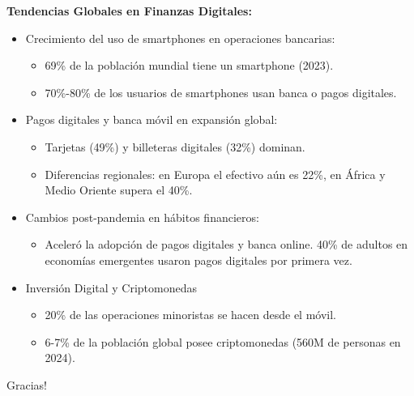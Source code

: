 \documentclass{beamer}
\begin{document}
\begin{frame}{\textbf{Tendencias Globales en Finanzas Digitales:}}
\begin{itemize}
    \item Crecimiento del uso de smartphones en operaciones bancarias:
    \begin{itemize} 
    \item 69\% de la población mundial tiene un smartphone (2023).
    \item 70\%-80\% de los usuarios de smartphones usan banca o pagos digitales.
    \end{itemize}
    
    \item Pagos digitales y banca móvil en expansión global:
    \begin{itemize} 
    \item Tarjetas (49\%) y billeteras digitales (32\%) dominan.
    \item Diferencias regionales: en Europa el efectivo aún es 22\%, en África y Medio Oriente supera el 40\%.
    \end{itemize}

    \item Cambios post-pandemia en hábitos financieros:
    \begin{itemize} 
   	\item Aceleró la adopción de pagos digitales y banca online. 40\% de adultos en economías emergentes usaron pagos digitales por primera vez.
    \end{itemize}
    
    \item Inversión Digital y Criptomonedas
    \begin{itemize}
    \item 20\% de las operaciones minoristas se hacen desde el móvil.
    \item 6-7\% de la población global posee criptomonedas (560M de personas en 2024).
    \end{itemize}
\end{itemize}
\end{frame}


\begin{frame}
    \begin{center}
    \Huge Gracias!
    \end{center}
\end{frame}
\end{document}
